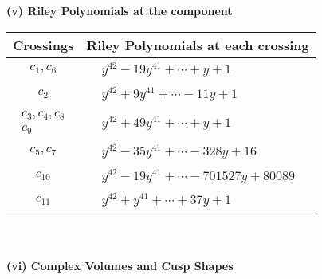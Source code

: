 \documentclass[1p]{elsarticle_modified}
\theoremstyle{definition}
\begin{document}
\newpage\renewcommand{\arraystretch}{1}
\flushleft \textbf{(v) Riley Polynomials at the component}\newline \\
\begin{tabular}{m{50pt}|m{274pt}}
Crossings & \hspace{64pt}Riley Polynomials at each crossing \\
\hline $$\begin{aligned}c_{1},c_{6}\end{aligned}$$&$\begin{aligned}
&y^{42}-19 y^{41}+\cdots+y+1
\end{aligned}$\\
\hline $$\begin{aligned}c_{2}\end{aligned}$$&$\begin{aligned}
&y^{42}+9 y^{41}+\cdots-11 y+1
\end{aligned}$\\
\hline $$\begin{aligned}c_{3},c_{4},c_{8}\\c_{9}\end{aligned}$$&$\begin{aligned}
&y^{42}+49 y^{41}+\cdots+y+1
\end{aligned}$\\
\hline $$\begin{aligned}c_{5},c_{7}\end{aligned}$$&$\begin{aligned}
&y^{42}-35 y^{41}+\cdots-328 y+16
\end{aligned}$\\
\hline $$\begin{aligned}c_{10}\end{aligned}$$&$\begin{aligned}
&y^{42}-19 y^{41}+\cdots-701527 y+80089
\end{aligned}$\\
\hline $$\begin{aligned}c_{11}\end{aligned}$$&$\begin{aligned}
&y^{42}+y^{41}+\cdots+37 y+1
\end{aligned}$\\
\hline
\end{tabular}\\~\\
\newpage\flushleft \textbf{(vi) Complex Volumes and Cusp Shapes}
\end{document}
